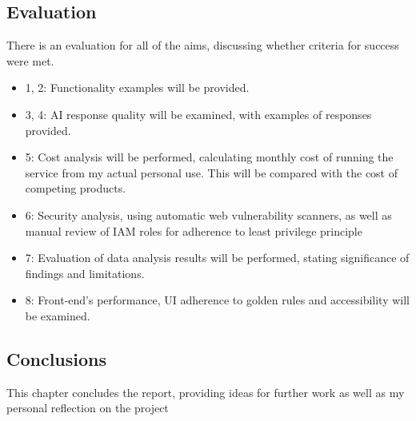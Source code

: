 \subsection{Evaluation}
There is an evaluation for all of the aims, discussing whether criteria for success were met.
\begin{itemize}
    \item 1, 2: Functionality examples will be provided.
    \item 3, 4: AI response quality will be examined, with examples of responses provided. 
    \item 5: Cost analysis will be performed, calculating monthly cost of running the service from my actual personal use. This will be compared with the cost of competing products.
    \item 6: Security analysis, using automatic web vulnerability scanners, as well as manual review of IAM roles for adherence to least privilege principle
    \item 7: Evaluation of data analysis results will be performed, stating significance of findings and limitations.
    \item 8: Front-end's performance, UI adherence to golden rules and accessibility will be examined.
\end{itemize}
\subsection{Conclusions}
This chapter concludes the report, providing ideas for further work as well as my personal reflection on the project




